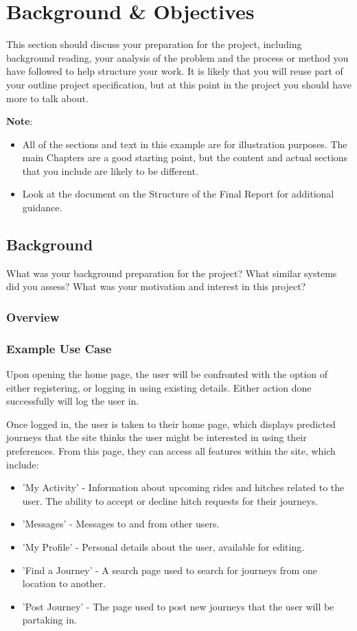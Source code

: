 \chapter{Background \& Objectives}

This section should discuss your preparation for the project, including background reading, your analysis of the problem and the process or method you have followed to help structure your work.  It is likely that you will reuse part of your outline project specification, but at this point in the project you should have more to talk about. 

\textbf{Note}: 

\begin{itemize}
   \item All of the sections and text in this example are for illustration purposes. The main Chapters are a good starting point, but the content and actual sections that you include are likely to be different.
   
   \item Look at the document on the Structure of the Final Report for additional guidance. 
   
\end {itemize}

\section{Background}
What was your background preparation for the project? What similar systems did you assess? What was your motivation and interest in this project? 
\subsection{Overview}
\subsection{Example Use Case}
	Upon opening the home page, the user will be confronted with  the option of either registering, or logging in using existing details. Either action done successfully will log the user in.
	
	Once logged in, the user is taken to their home page, which displays predicted journeys that the site thinks the user might be interested in using their preferences. From this page, they can access all features within the site, which include:
	\begin{itemize}
		\item 'My Activity' - Information about upcoming rides and hitches related to the user. The ability to accept or decline hitch requests for their journeys.
		\item 'Messages' - Messages to and from other users.
		\item 'My Profile' - Personal details about the user, available for editing.
		\item 'Find a Journey' - A search page used to search for journeys from one location to another.
		\item 'Post Journey' - The page used to post new journeys that the user will be partaking in.		
	\end{itemize}
	
